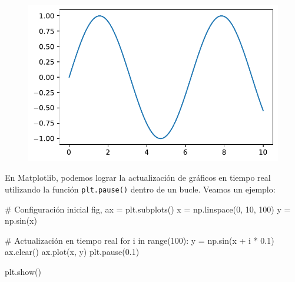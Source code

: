 \documentclass[
  a4paper,
]{article}
\newenvironment{Shaded}{}{}
\newcommand{\BuiltInTok}[1]{\textcolor[rgb]{0.84,0.23,0.29}{#1}}
\newcommand{\CommentTok}[1]{\textcolor[rgb]{0.42,0.45,0.49}{#1}}
\newcommand{\ControlFlowTok}[1]{\textcolor[rgb]{0.84,0.23,0.29}{#1}}
\newcommand{\DecValTok}[1]{\textcolor[rgb]{0.00,0.36,0.77}{#1}}
\newcommand{\FloatTok}[1]{\textcolor[rgb]{0.00,0.36,0.77}{#1}}
\newcommand{\KeywordTok}[1]{\textcolor[rgb]{0.84,0.23,0.29}{#1}}
\newcommand{\NormalTok}[1]{\textcolor[rgb]{0.14,0.16,0.18}{#1}}
\newcommand{\OperatorTok}[1]{\textcolor[rgb]{0.14,0.16,0.18}{#1}}
\begin{document}
\begin{figure}[H]

{\centering \includegraphics{index_files/figure-pdf/cell-4-output-1.pdf}

}

\end{figure}

En Matplotlib, podemos lograr la actualización de gráficos en tiempo
real utilizando la función \texttt{plt.pause()} dentro de un bucle.
Veamos un ejemplo:

\begin{Shaded}
\begin{Highlighting}[]
\CommentTok{\# Configuración inicial}
\NormalTok{fig, ax }\OperatorTok{=}\NormalTok{ plt.subplots()}
\NormalTok{x }\OperatorTok{=}\NormalTok{ np.linspace(}\DecValTok{0}\NormalTok{, }\DecValTok{10}\NormalTok{, }\DecValTok{100}\NormalTok{)}
\NormalTok{y }\OperatorTok{=}\NormalTok{ np.sin(x)}

\CommentTok{\# Actualización en tiempo real}
\ControlFlowTok{for}\NormalTok{ i }\KeywordTok{in} \BuiltInTok{range}\NormalTok{(}\DecValTok{100}\NormalTok{):}
\NormalTok{    y }\OperatorTok{=}\NormalTok{ np.sin(x }\OperatorTok{+}\NormalTok{ i }\OperatorTok{*} \FloatTok{0.1}\NormalTok{)}
\NormalTok{    ax.clear()}
\NormalTok{    ax.plot(x, y)}
\NormalTok{    plt.pause(}\FloatTok{0.1}\NormalTok{)}

\NormalTok{plt.show()}
\end{Highlighting}
\end{Shaded}
\end{document}
